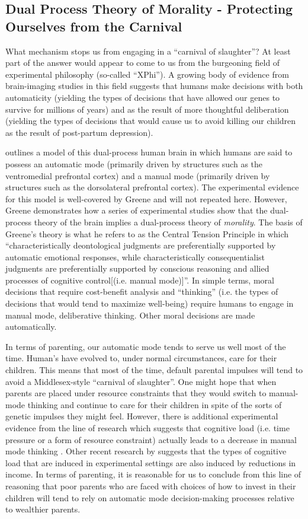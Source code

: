 \documentclass[1p, review]{elsarticle}\usepackage[]{graphicx}\usepackage[]{color}
\begin{document}
\subsection{Dual Process Theory of Morality - Protecting Ourselves from the Carnival}
What mechanism stops us from engaging in a ``carnival of slaughter''? At least part of the answer would appear to come to us from the burgeoning field of experimental philosophy (so-called ``XPhi''). A growing body of evidence from brain-imaging studies in this field suggests that humans make decisions with both automaticity (yielding the types of decisions that have allowed our genes to survive for millions of years) and as the result of more thoughtful deliberation (yielding the types of decisions that would cause us to avoid killing our children as the result of post-partum depression). 

\citet{Greene2014} outlines a model of this dual-process human brain in which humans are said to possess an automatic mode (primarily driven by structures such as the ventromedial prefrontal cortex) and a manual mode (primarily driven by structures such as the dorsolateral prefrontal cortex). The experimental evidence for this model is well-covered by Greene and will not repeated here. However, Greene demonstrates how a series of experimental studies show that the dual-process theory of the brain implies a dual-process theory of \emph{morality}. The basis of Greene's theory is what he refers to as the Central Tension Principle in which ``characteristically deontological judgments are preferentially supported by automatic emotional responses, while characteristically consequentialist judgments are preferentially supported by conscious reasoning and allied processes of cognitive control[(i.e. manual mode)]''. In simple terms, moral decisions that require cost-benefit analysis and ``thinking'' (i.e. the types of decisions that would tend to maximize well-being) require humans to engage in manual mode, deliberative thinking. Other moral decisions are made automatically.

In terms of parenting, our automatic mode tends to serve us well most of the time. Human's have evolved to, under normal circumstances, care for their children. This means that most of the time, default parental impulses will tend to avoid a Middlesex-style ``carnival of slaughter''. One might hope that when parents are placed under resource constraints that they would switch to manual-mode thinking and continue to care for their children in spite of the sorts of genetic impulses they might feel. However, there is additional experimental evidence from the \citet{Greene2014} line of research which suggests that cognitive load (i.e. time pressure or a form of resource constraint) actually leads to a decrease in manual mode thinking \citep{Suter2011, Paxton2012}. Other recent research by \citet{Mani2013} suggests that the types of cognitive load that are induced in experimental settings are also induced by reductions in income. In terms of parenting, it is reasonable for us to conclude from this line of reasoning that poor parents who are faced with choices of how to invest in their children will tend to rely on automatic mode decision-making processes relative to wealthier parents. 
\end{document}
